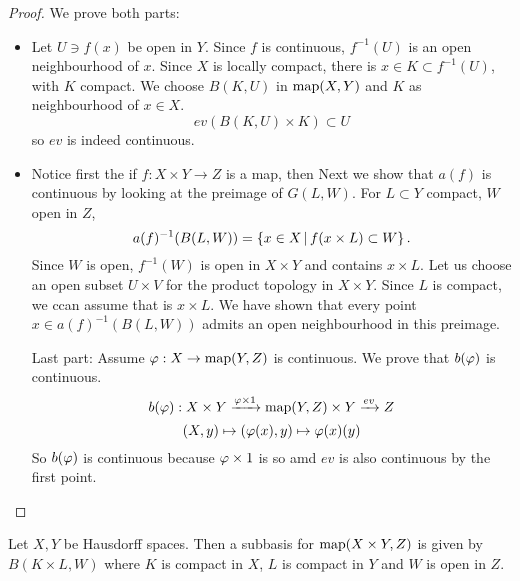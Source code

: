     \begin{proof} We prove both parts:
        \begin{itemize}
            \item 
                Let $U \ni f(x)$ be open in $Y$. Since $f$ is continuous,
                $f^{-1}(U)$ is an open neighbourhood of $x$. Since $X$ is locally compact,
                there is $x \in K \subset f^{-1}(U)$, with $K$ compact.
                We choose $B(K, U)$ in $\operatorname{map}(X, Y)$ and $K$ as neighbourhood of $x \in X$.
                \[
                    ev(B(K, U) \times K) \subset U
                \]
                so $ev$ is indeed continuous.
            \item Notice first the if $f: X \times Y \to Z$ is a map,
                then 
                Next we show that $a(f)$ is continuous by looking at the preimage of 
                $G(L, W)$. For $L \subset Y$ compact, $W$ open in $Z$, 
                \[
                    a(f)^{-1}(B(L, W)) = \left\{ x \in X \, \middle| \, f(x \times L) \subset W \right\}.
                \]
                Since $W$ is open, $f^{-1}(W)$ is open in $X \times Y$ and contains 
                $x \times L$.
                Let us choose an open subset $U \times V$ for the product topology
                in $X \times Y$. Since $L$ is compact, we ccan assume that is $x \times L$.
                We have shown that every point $x \in a(f)^{-1}(B(L, W))$
                admits an open neighbourhood in this preimage.
            
                Last part: Assume $\varphi: X \to \operatorname{map}(Y, Z)$ is continuous. 
                We prove that $b(\varphi)$ is continuous.
                \[
                    b(\varphi): 
                        X \times Y
                        \xrightarrow{\varphi \times 1}
                        \operatorname{map}(Y, Z) \times Y
                        \xrightarrow{ev} Z
                \]
                \[
                    (X, y) \mapsto (\varphi(x), y) 
                    \mapsto \varphi(x)(y)
                \]
                So $b(\varphi)$ is continuous because $\varphi \times 1$ is so
                amd $ev$ is also continuous by the first point.
        \end{itemize}
    \end{proof}

    \begin{lemma}
        Let $X, Y$ be Hausdorff spaces. Then a subbasis for $\operatorname{map}(X \times Y, Z)$
        is given by $B(K \times L, W)$
        where $K$ is compact in $X$, $L$ is compact in $Y$ and $W$ is open in $Z$.
    \end{lemma}


